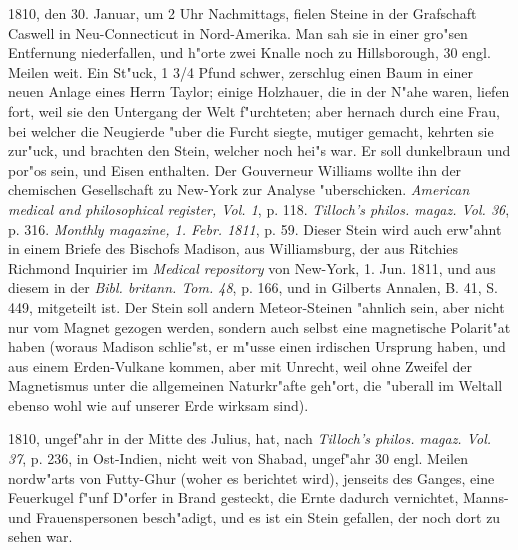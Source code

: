 \documentclass[a4paper, 11pt, oneside, polutonikogreek, german]{article}
\begin{document}
1810, den 30. Januar, um 2 Uhr Nachmittags, fielen Steine in der Grafschaft Caswell in Neu-Connecticut in Nord-Amerika. Man sah sie in einer gro"sen Entfernung niederfallen, und h"orte zwei Knalle noch zu Hillsborough, 30 engl. Meilen weit. Ein St"uck, 1 3/4 Pfund schwer, zerschlug einen Baum in einer neuen Anlage eines Herrn Taylor; einige Holzhauer, die in der N"ahe waren, liefen fort, weil sie den Untergang der Welt f"urchteten; aber hernach durch eine Frau, bei welcher die Neugierde "uber die Furcht siegte, mutiger gemacht, kehrten sie zur"uck, und brachten den Stein, welcher noch hei"s war. Er soll dunkelbraun und por"os sein, und Eisen enthalten. Der Gouverneur Williams wollte ihn der chemischen Gesellschaft zu New-York zur Analyse "uberschicken. \emph{American medical and philosophical register, Vol. 1}, p. 118. \emph{Tilloch's philos. magaz. Vol. 36}, p. 316. \emph{Monthly magazine, 1. Febr. 1811}, p. 59. Dieser Stein wird auch erw"ahnt in einem Briefe des Bischofs Madison, aus Williamsburg, der aus Ritchies Richmond Inquirier im \emph{Medical repository} von New-York, 1. Jun. 1811, und aus diesem in der \emph{Bibl. britann. Tom. 48}, p. 166, und in Gilberts Annalen, B. 41, S. 449, mitgeteilt ist. Der Stein soll andern Meteor-Steinen "ahnlich sein, aber nicht nur vom Magnet gezogen werden, sondern auch selbst eine magnetische Polarit"at haben (woraus Madison schlie"st, er m"usse einen irdischen Ursprung haben, und aus einem Erden-Vulkane kommen, aber mit Unrecht, weil ohne Zweifel der Magnetismus unter die allgemeinen Naturkr"afte geh"ort, die "uberall im Weltall ebenso wohl wie auf unserer Erde wirksam sind).

1810, ungef"ahr in der Mitte des Julius, hat, nach \emph{Tilloch's philos. magaz. Vol. 37}, p. 236, in Ost-Indien, nicht weit von Shabad, ungef"ahr 30 engl. Meilen nordw"arts von Futty-Ghur (woher es berichtet wird), jenseits des Ganges, eine Feuerkugel f"unf D"orfer in Brand gesteckt, die Ernte dadurch vernichtet, Manns- und Frauenspersonen besch"adigt, und es ist ein Stein gefallen, der noch dort zu sehen war.
\end{document}
